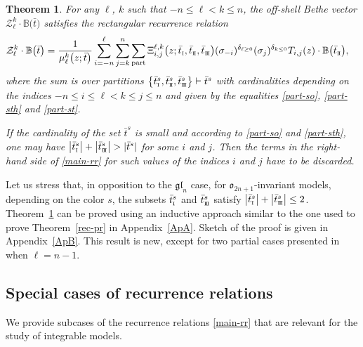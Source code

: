 \documentclass[10pt,a4paper]{amsart}
\newcommand{\so}{\scriptscriptstyle \rm I}
\newcommand{\st}{\scriptscriptstyle \rm I\hspace{-1pt}I}
\newcommand{\sth}{\scriptscriptstyle \rm I\hspace{-1pt}I\hspace{-1pt}I}
\newcommand{\bt}{{\bar t}}
\newtheorem{thm}{Theorem}[section]
\theoremstyle{definition}
\def\BB{{\mathbb{B}}}
\def\r#1{\eqref{#1}}
\def\Z{\mathcal{Z}}
\begin{document}
\begin{thm}\label{main-th}
For any $\ell$, $k$ such that $-n\leq \ell <k\leq n$, the off-shell Bethe vector
$\Z^k_\ell\cdot\BB\bigl(\bt\bigr)$ satisfies the rectangular recurrence relation
\begin{align}
\Z^k_\ell\cdot\BB\bigl(\bt\bigr)={}&\frac{1}{\mu^k_\ell\bigl(z;\bt\bigr)}\sum_{i=-n}^\ell
\sum_{j=k}^n\sum_{\rm part}
\Xi^{\ell,k}_{i,j}\bigl(z;\bt_{\so},\bt_{\st},\bt_{\sth}\bigr) (\sigma_{-i})^{\delta_{\ell\geq0}}
(\sigma_{j})^{\delta_{k\leq 0}} T_{i,j}(z)\cdot\BB\bigl(\bt_{\st}\bigr) ,\label{main-rr}
\end{align}
where the sum is over partitions
$\bigl\{\bt^s_{\so},\bt^s_{\st},\bt^s_{\sth}\bigr\}\vdash \bt^s$ with
cardinalities depending on the indices $-n\leq i\leq \ell<k\leq j\leq n$ and given by the equalities \r{part-so}, \r{part-sth} and \r{part-st}.

If the cardinality of the set $\bt^s$ is small and
according to \r{part-so} and \r{part-sth}, one may have $\big|\bt^s_{\so}\big|+\big|\bt^s_{\sth}\big|>|\bt^s|$
for some $i$ and $j$. Then the terms in
the right-hand side of \r{main-rr} for such values of the indices $i$ and $j$ have to be discarded.
\end{thm}


Let us stress that, in opposition to the $\mathfrak{gl}_n$ case, for
$\mathfrak{o}_{2n+1}$-invariant models, depending on the color $s$,
the subsets $\bt^s_{\so}$ and $\bt^s_{\sth}$ satisfy $\big|\bt^s_{\so}\big|+\big|\bt^s_{\sth}\big| \le 2$.
Theorem~\ref{main-th} can be proved using an inductive
approach similar to the one used to prove Theorem~\ref{rec-pr} in Appendix~\ref{ApA}. Sketch of the proof is given in Appendix~\ref{ApB}.
This result is new, except for two partial cases presented in~\cite{LP2} when $\ell=n-1$.

\subsection{Special cases of recurrence relations}\label{sect:ex-rec}
We provide subcases of the recurrence relations
\r{main-rr} that are relevant for the study of integrable models.
\end{document}
